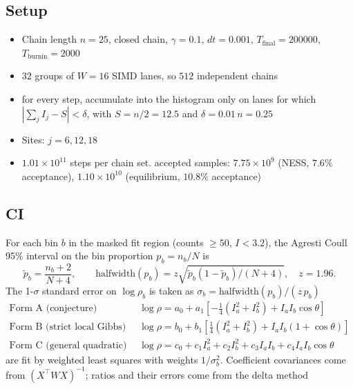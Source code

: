 \documentclass[11pt]{article}
\begin{document}
\subsection*{Setup}


\begin{itemize}

\item Chain length $n=25$, closed chain, $\gamma=0.1$, $dt=0.001$,
$T_{\mathrm{final}}=200000$, $T_{\mathrm{burnin}}=2000$
\item $32$ groups of $W=16$ SIMD lanes, so $512$ independent chains
\item for every step, accumulate into the histogram
only on lanes for which $|\sum_j I_j - S| < \delta$, with $S = n/2 = 12.5$
and $\delta = 0.01\,n = 0.25$
\item Sites: $j=6, 12, 18$ 
\item $1.01\times 10^{11}$ steps per chain set.
accepted samples: $7.75\times 10^9$ (NESS, $7.6\%$ acceptance),
$1.10\times 10^{10}$ (equilibrium, $10.8\%$ acceptance)

\end{itemize}

\subsection*{CI}
For each bin $b$ in the masked fit region (counts $\geq 50$, $I<3.2$),
the Agresti Coull 95\% interval on the bin proportion $p_b=n_b/N$ is
\[
\tilde p_b = \frac{n_b+2}{N+4}, \qquad
\text{halfwidth}(p_b) = z\sqrt{\tilde p_b(1-\tilde p_b)/(N+4)}, \quad z=1.96.
\]
The 1-$\sigma$ standard error on $\log\rho_b$ is taken as
$\sigma_b = \text{halfwidth}(p_b)/(z\,\hat p_b)$ 
\begin{align*}
\text{Form A (conjecture)} \quad
& \log\rho = a_0 + a_1\!\left[-\tfrac{1}{4}(I_a^2+I_b^2) + I_a I_b\cos\theta\right] \\
\text{Form B (strict local Gibbs)} \quad
& \log\rho = b_0 + b_1\!\left[\tfrac{1}{4}(I_a^2+I_b^2) + I_a I_b(1+\cos\theta)\right] \\
\text{Form C (general quadratic)} \quad
& \log\rho = c_0 + c_1 I_a^2 + c_2 I_b^2 + c_3 I_a I_b + c_4 I_a I_b\cos\theta
\end{align*}
are fit by weighted least squares with weights $1/\sigma_b^2$.
Coefficient covariances come from $(X^\top W X)^{-1}$; ratios and their
errors come from the delta method
\end{document}
